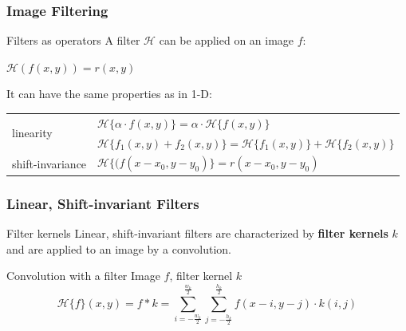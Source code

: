 \begin{frame}
    \frametitle{Image Filtering}
    \begin{block}{Filters as operators}
        A filter $\mathcal{H}$ can be applied on an image $f$:
        \begin{center}
            $\mathcal{H}(f(x,y)) = r(x,y)$
        \end{center}
        It can have the same properties as in 1-D:
        \bigskip

        \begin{tabularx}{\textwidth}{lX}
            \multirow{2}{*}{linearity} & \rule{0pt}{1.25em}$\mathcal{H}\lbrace\alpha\cdot f(x,y)\rbrace = \alpha\cdot
                \mathcal{H}\lbrace f(x,y)\rbrace$                                                                              \\
                                       & \rule{0pt}{1.25em}$\mathcal{H}\lbrace f_1(x,y) + f_2(x,y)\rbrace = \mathcal{H}\lbrace
                f_1(x,y)\rbrace + \mathcal{H}\lbrace f_2(x,y)\rbrace$                                                          \\
            shift-invariance           & \rule{0pt}{2em}$\mathcal{H}\lbrace (f(x-x_0, y-y_0)\rbrace = r(x-x_0, y-y_0)$
        \end{tabularx}
    \end{block}
\end{frame}

\begin{frame}
    \frametitle{Linear, Shift-invariant Filters}
    \begin{block}{Filter kernels}
        Linear, shift-invariant filters are characterized by \textbf{filter kernels}
        $k$ and are applied to an image by a convolution.
    \end{block}
    \begin{block}{Convolution with a filter}
        Image $f$, filter kernel $k$\vspace{-0.5\bigskipamount}
        \begin{equation*}
            \mathcal{H}\lbrace f\rbrace(x,y) = f\ast k = \sum_{i=-\frac{w_k}{2}}^{\frac{w_k}{2}}
            \sum_{j=-\frac{h_k}{2}}^{\frac{h_k}{2}} f(x-i, y-j)\cdot k(i, j)
        \end{equation*}
    \end{block}\vspace{-0.5\bigskipamount}
\end{frame}

